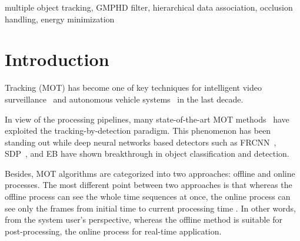 \documentclass[journal]{IEEEtran}
\newcounter{ct}
\begin{document}
\begin{IEEEkeywords}
multiple object tracking, GMPHD filter, hierarchical data association, occlusion handling, energy minimization
\end{IEEEkeywords}






\IEEEpeerreviewmaketitle




\section{Introduction}

 Tracking (MOT) has become one of key techniques for intelligent video surveillance~\cite{MOT15,MOT16} and autonomous vehicle systems~\cite{kitti} in the last decade. 

In view of the processing pipelines, many state-of-the-art MOT methods~\cite{prev1,prev2,sort,bae2, ham, fu1, mdp, tbss, scea, eamtt, rmot, gscr, bae1, cnntcm, siameseCNN, nomt, mhtdam, elp, jpdam, moticon, segtrack, cem, smot, dpnms, motdt, mtdf, dman, amadm, gmphdn1tr, gmphdkcf, gmphd2012, ehaf, fwt, jcc, tlmht, edmt, iou, mhtlstm} have exploited the tracking-by-detection paradigm. This phenomenon has been standing out while deep neural networks based detectors such as FRCNN~\cite{frcnn}, SDP~\cite{sdp}, and EB\cite{eb} have shown breakthrough in object classification and detection.

Besides, MOT algorithms are categorized into two approaches: offline and online processes. The most different point between two approaches is that whereas the offline process can see the whole time sequences at once, the online process can see only the frames from initial time  to current processing time . In other words, from the system user's perspective, whereas the offline method is suitable for post-processing, the online process for real-time application.
\end{document}
